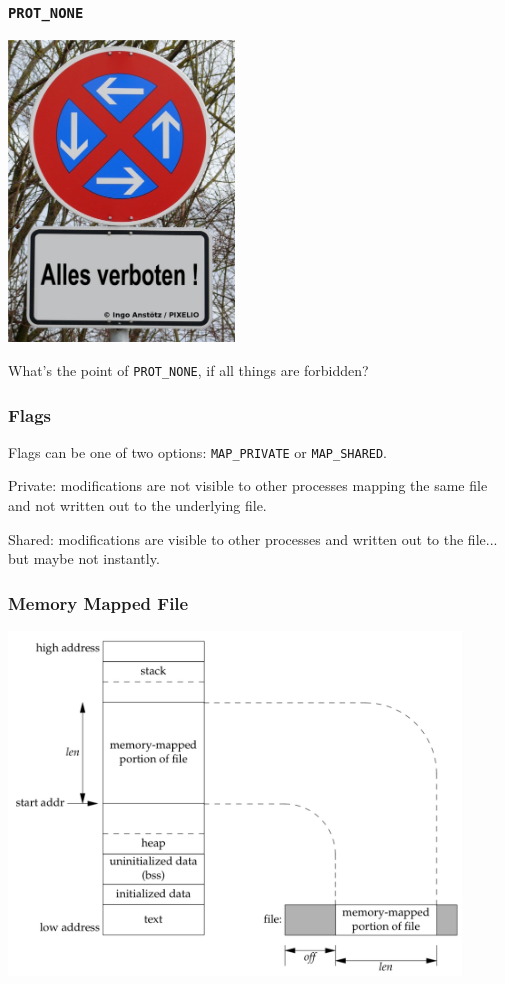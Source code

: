 \begin{frame}
	\frametitle{\texttt{PROT\_NONE}}

	\begin{center}
		\includegraphics[width=0.45\textwidth]{images/AllesVerboten.jpg}
	\end{center}

	What's the point of \texttt{PROT\_NONE}, if all things are forbidden?

\end{frame}


\begin{frame}
	\frametitle{Flags}
	Flags can be one of two options: \texttt{MAP\_PRIVATE} or \texttt{MAP\_SHARED}.

	Private: modifications are not visible to other processes mapping the same file and not written out to the underlying file.

	Shared: modifications are visible to other processes and written out to the file... but maybe not instantly.

\end{frame}


\begin{frame}
	\frametitle{Memory Mapped File}

	\begin{center}
		\includegraphics[width=0.9\textwidth]{images/memory-mapped-file.png}
	\end{center}

\end{frame}


